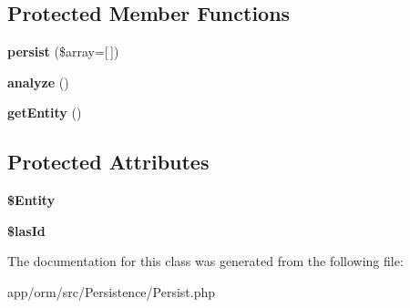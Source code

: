 \subsection*{Protected Member Functions}
\begin{DoxyCompactItemize}
\item 
{\bfseries persist} (\$array=\mbox{[}$\,$\mbox{]})\hypertarget{classORM_1_1Persistence_1_1Persist_ab1681a85d3a2031c0beb1a2908067c3b}{}\label{classORM_1_1Persistence_1_1Persist_ab1681a85d3a2031c0beb1a2908067c3b}

\item 
{\bfseries analyze} ()\hypertarget{classORM_1_1Persistence_1_1Persist_acb5ee239c02a21c6f25d05fc0786a8d7}{}\label{classORM_1_1Persistence_1_1Persist_acb5ee239c02a21c6f25d05fc0786a8d7}

\item 
{\bfseries get\+Entity} ()\hypertarget{classORM_1_1Persistence_1_1Persist_ac21a3c6871afbd04e0a246de8d0a7454}{}\label{classORM_1_1Persistence_1_1Persist_ac21a3c6871afbd04e0a246de8d0a7454}

\end{DoxyCompactItemize}
\subsection*{Protected Attributes}
\begin{DoxyCompactItemize}
\item 
{\bfseries \$\+Entity}\hypertarget{classORM_1_1Persistence_1_1Persist_a01fde0f4d76bab25e8352f5edbd5fb4d}{}\label{classORM_1_1Persistence_1_1Persist_a01fde0f4d76bab25e8352f5edbd5fb4d}

\item 
{\bfseries \$las\+Id}\hypertarget{classORM_1_1Persistence_1_1Persist_a71f64da053ccb7f7b3b09e67ffbb6678}{}\label{classORM_1_1Persistence_1_1Persist_a71f64da053ccb7f7b3b09e67ffbb6678}

\end{DoxyCompactItemize}


The documentation for this class was generated from the following file\+:\begin{DoxyCompactItemize}
\item 
app/orm/src/\+Persistence/Persist.\+php\end{DoxyCompactItemize}
